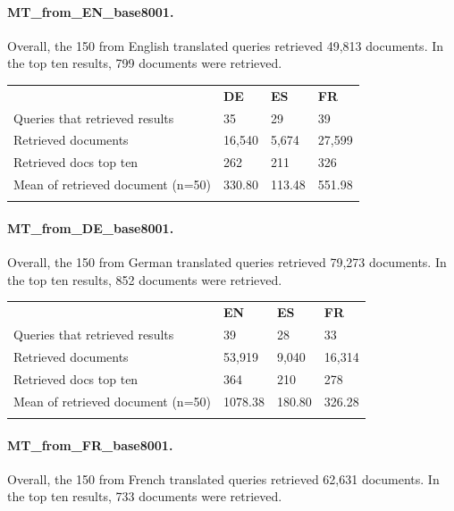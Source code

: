 \documentclass[a4paper,11pt]{article}
\begin{document}
\paragraph{MT\_from\_EN\_base8001.}
Overall, the 150 from English translated queries retrieved 49,813 documents. In the top ten results, 799 documents were retrieved.

\begin{table}[h]
\centering
\begin{tabularx}{0.81\textwidth}{llll}
\cmidrule{1-4}
\addlinespace
& \textbf{DE} & \textbf{ES} & \textbf{FR} \\
\addlinespace
\cmidrule{1-4}
\addlinespace
Queries that retrieved results & 35 & 29 & 39 \\
Retrieved documents & 16,540 & 5,674 & 27,599 \\
Retrieved docs top ten & 262 & 211 & 326 \\
Mean of retrieved document (n=50) & 330.80 & 113.48 & 551.98 \\
\addlinespace
\cmidrule{1-4}
\end{tabularx}
\label{result_list_analysis_mt_en}
\end{table}

\newpage

\paragraph{MT\_from\_DE\_base8001.}
Overall, the 150 from German translated queries retrieved 79,273 documents. In the top ten results, 852 documents were retrieved.

\begin{table}[!h]
\centering
\begin{tabularx}{0.81\textwidth}{llll}
\cmidrule{1-4}
\addlinespace
& \textbf{EN} & \textbf{ES} & \textbf{FR} \\
\addlinespace
\cmidrule{1-4}
\addlinespace
Queries that retrieved results & 39 & 28 & 33 \\
Retrieved documents & 53,919 & 9,040 & 16,314 \\
Retrieved docs top ten & 364 & 210 & 278 \\
Mean of retrieved document (n=50) & 1078.38 & 180.80 & 326.28 \\
\addlinespace
\cmidrule{1-4}
\end{tabularx}
\label{result_list_analysis_mt_de}
\end{table}

\paragraph{MT\_from\_FR\_base8001.}
Overall, the 150 from French translated queries retrieved 62,631 documents. In the top ten results, 733 documents were retrieved.
\end{document}
